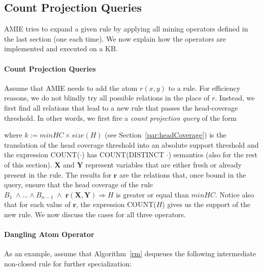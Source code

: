 \subsection{Count Projection Queries}
\label{subsec:countqueries}

AMIE tries to expand a given rule by applying all mining operators defined in the last section (one each time). 
We now explain how the operators are implemented and executed on a KB.

\paragraph{Count Projection Queries} 
Assume that AMIE needs to add the atom $r(x,y)$ to a rule. 
For efficiency reasons, we do not blindly try all possible relations in the place of $r$. Instead, we first 
find all relations that lead to a new rule that passes the head-coverage threshold.
In other words, we first fire a \emph{count projection query} of the form


\noindent where $k := minHC \times size(H)$ (see Section~\ref{par:headCoverage}) is the translation of the
head coverage threshold into an absolute support threshold and the expression COUNT($\cdot$) 
has COUNT(DISTINCT $\cdot$) semantics (also for the rest of this section).
$\bm{X}$ and $\bm{Y}$ represent variables that are either fresh or already present in the rule.
The results for $\bm{r}$ are the relations that, once bound in the query, 
ensure that the head coverage of the rule $B_1 \; \wedge ... \wedge B_{n-1} \;\wedge\; \bm{r}(\bm{X},\bm{Y}) \Rightarrow H$ is greater
or equal than $minHC$.
Notice also that for each value of $\bm{r}$, the expression COUNT($H$) gives us the support of the new rule.
We now discuss the cases for all three operators.

\paragraph{Dangling Atom Operator} 
As an example, assume that Algorithm~\ref{rm} dequeues the following intermediate non-closed rule for further specialization:

